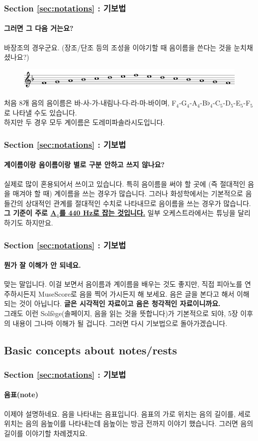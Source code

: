 \documentclass{beamer}
\begin{document}
	\begin{frame}
		\frametitle{Section \ref{sec:notations} : 기보법}
		\framesubtitle{그러면 그 다음 거는요?}
		\flushleft
		바장조의 경우군요. (장조/단조 등의 조성을 이야기할 때 음이름을 쓴다는 것을 눈치채셨나요?)
		\begin{figure}[!h]
			\centering
			{\includegraphics[width=\textwidth]{res/pdf/4/syllable/doremi_F.pdf}}
		\end{figure}
		처음 8개 음의 음이름은 바-사-가-내림나-다-라-마-바이며, F$_4$-G$_4$-A$_4$-B$\flat_4$-C$_5$-D$_5$-E$_5$-F$_5$로 나타낼 수도 있습니다.\\
		하지만 두 경우 모두 계이름은 도레미파솔라시도입니다.
	\end{frame}
	
	\begin{frame}
		\frametitle{Section \ref{sec:notations} : 기보법}
		\framesubtitle{계이름이랑 음이름이랑 별로 구분 안하고 쓰지 않나요?}
		실제로 많이 혼용되어서 쓰이고 있습니다. 특히 음이름을 써야 할 곳에 (즉 절대적인 음을 매겨야 할 때) 계이름을 쓰는 경우가 많습니다. 그러나 화성학에서는 기본적으로 음들간의 상대적인 관계를 절대적인 수치로 나타내므로 음이름을 쓰는 경우가 많습니다. {\bf 그 기준이 주로 {\color{cyan} \href{run:res/mp3/2/pitch/A4.mp3}{A$_4$를 440 Hz로 잡는 것입니다.}}} 일부 오케스트라에서는 튜닝을 달리 하기도 하지만요.
	\end{frame}
	
	\begin{frame}
		\frametitle{Section \ref{sec:notations} : 기보법}
		\framesubtitle{뭔가 잘 이해가 안 되네요.}
		맞는 말입니다. 이걸 보면서 음이름과 계이름을 배우는 것도 좋지만, 직접 피아노를 연주하시든지 MuseScore로 음을 찍어 가시든지 해 보세요. 음은 글을 본다고 해서 이해되는 것이 아닙니다. {\bf 글은 시각적인 자료이고 음은 청각적인 자료이니까요.}\\
		그래도 이런 Solfège(솔페이지, 음을 읽는 것을 뜻합니다)가 기본적으로 되야, 5장 이후의 내용이 그나마 이해가 될 겁니다. 그러면 다시 기보법으로 돌아가겠습니다.
	\end{frame}
	\subsection{Basic concepts about notes/rests}
	\begin{frame}
		\frametitle{Section \ref{sec:notations} : 기보법}
		\framesubtitle{음표(note)}
		이제야 설명하네요. 음을 나타내는 음표입니다. 음표의 가로 위치는 음의 길이를, 세로 위치는 음의 음높이를 나타내는데 음높이는 방금 전까지 이야기 했습니다. 그러면 음의 길이를 이야기할 차례겠지요.
	\end{frame}
	
\end{document}
